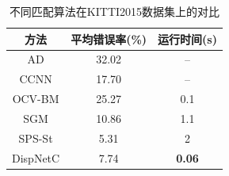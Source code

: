 \begin{table}[!htb]
	\centering
	\caption{不同匹配算法在KITTI2015数据集上的对比}
	\label{tab:4_3_cmp_kitti}
		\begin{tabular*}{\textwidth}{@{\extracolsep{\fill}}ccc} \toprule[2pt]
			方法             & 平均错误率(\%) & 运行时间(s) \\ \midrule[1pt]
			AD               & 32.02                 & --      \\
			CCNN          & 17.70                  & --      \\
			OCV-BM      & 25.27                  &  0.1    \\
			SGM            & 10.86                 &  1.1     \\
			SPS-St         & 5.31                    & 2         \\
			DispNetC     & 7.74                   & \textbf{0.06}  \\ \bottomrule[2pt]
		\end{tabular*}
	
\end{table}


